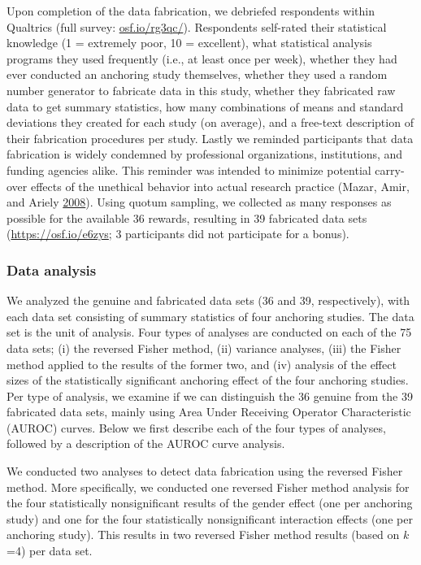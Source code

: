 \documentclass[a5paper]{book}
\begin{document}
Upon completion of the data fabrication, we debriefed respondents within
Qualtrics (full survey: \href{https://osf.io/rg3qc/}{osf.io/rg3qc/}).
Respondents self-rated their statistical knowledge (1 = extremely poor,
10 = excellent), what statistical analysis programs they used frequently
(i.e., at least once per week), whether they had ever conducted an
anchoring study themselves, whether they used a random number generator
to fabricate data in this study, whether they fabricated raw data to get
summary statistics, how many combinations of means and standard
deviations they created for each study (on average), and a free-text
description of their fabrication procedures per study. Lastly we
reminded participants that data fabrication is widely condemned by
professional organizations, institutions, and funding agencies alike.
This reminder was intended to minimize potential carry-over effects of
the unethical behavior into actual research practice (Mazar, Amir, and
Ariely \protect\hyperlink{ref-doi:10.1509ux2fjmkr.45.6.633}{2008}).
Using quotum sampling, we collected as many responses as possible for
the available 36 rewards, resulting in 39 fabricated data sets
(\url{https://osf.io/e6zys}; 3 participants did not participate for a
bonus).

\subsubsection{Data analysis}\label{data-analysis}

We analyzed the genuine and fabricated data sets (36 and 39,
respectively), with each data set consisting of summary statistics of
four anchoring studies. The data set is the unit of analysis. Four types
of analyses are conducted on each of the 75 data sets; (i) the reversed
Fisher method, (ii) variance analyses, (iii) the Fisher method applied
to the results of the former two, and (iv) analysis of the effect sizes
of the statistically significant anchoring effect of the four anchoring
studies. Per type of analysis, we examine if we can distinguish the 36
genuine from the 39 fabricated data sets, mainly using Area Under
Receiving Operator Characteristic (AUROC) curves. Below we first
describe each of the four types of analyses, followed by a description
of the AUROC curve analysis.

We conducted two analyses to detect data fabrication using the reversed
Fisher method. More specifically, we conducted one reversed Fisher
method analysis for the four statistically nonsignificant results of the
gender effect (one per anchoring study) and one for the four
statistically nonsignificant interaction effects (one per anchoring
study). This results in two reversed Fisher method results (based on
\(k\)=4) per data set.
\end{document}
